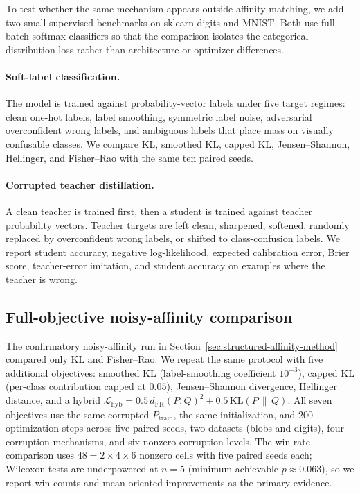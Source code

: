\documentclass[11pt]{article}
\begin{document}
To test whether the same mechanism appears outside affinity matching, we add two small
supervised benchmarks on sklearn digits and MNIST. Both use full-batch softmax classifiers so
that the comparison isolates the categorical distribution loss rather than architecture or
optimizer differences.

\paragraph{Soft-label classification.}
The model is trained against probability-vector labels under five target regimes: clean
one-hot labels, label smoothing, symmetric label noise, adversarial overconfident wrong labels,
and ambiguous labels that place mass on visually confusable classes. We compare KL, smoothed
KL, capped KL, Jensen--Shannon, Hellinger, and Fisher--Rao with the same ten paired seeds.

\paragraph{Corrupted teacher distillation.}
A clean teacher is trained first, then a student is trained against teacher probability
vectors. Teacher targets are left clean, sharpened, softened, randomly replaced by
overconfident wrong labels, or shifted to class-confusion labels. We report student accuracy,
negative log-likelihood, expected calibration error, Brier score, teacher-error imitation, and
student accuracy on examples where the teacher is wrong.

\subsection{Full-objective noisy-affinity comparison}
\label{sec:full-objective}

The confirmatory noisy-affinity run in Section~\ref{sec:structured-affinity-method} compared
only KL and Fisher--Rao. We repeat the same protocol with five additional objectives: smoothed
KL (label-smoothing coefficient $10^{-3}$), capped KL (per-class contribution capped at
$0.05$), Jensen--Shannon divergence, Hellinger distance, and a hybrid
$\mathcal{L}_{\mathrm{hyb}} = 0.5\,d_{\mathrm{FR}}(P,Q)^2 + 0.5\,\mathrm{KL}(P\,\|\,Q)$.
All seven objectives use the same corrupted $P_{\mathrm{train}}$, the same initialization, and
$200$ optimization steps across five paired seeds, two datasets (blobs and digits), four
corruption mechanisms, and six nonzero corruption levels. The win-rate comparison uses
$48 = 2 \times 4 \times 6$ nonzero cells with five paired seeds each; Wilcoxon tests are
underpowered at $n{=}5$ (minimum achievable $p \approx 0.063$), so we report win counts and
mean oriented improvements as the primary evidence.
\end{document}
